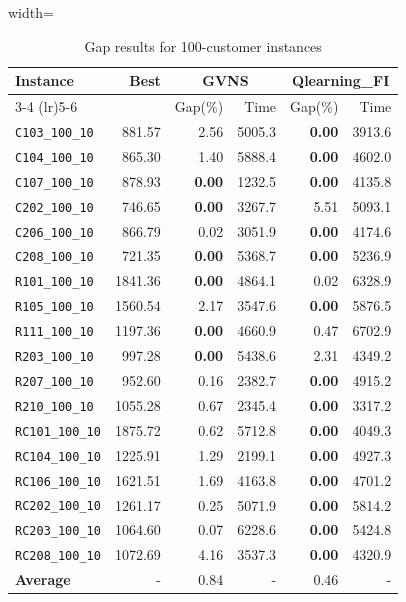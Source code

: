 \begin{table}[ht]
\centering
\small
\setlength{\tabcolsep}{5pt}
\caption{Gap results for 100-customer instances}
\vspace{4mm}
\begin{adjustbox}{width=\textwidth}
\begin{tabular}{l r r r @{\hspace{8pt}} r r @{\hspace{8pt}}}
\toprule
\multirow{2}{*}{Instance} & \multirow{2}{*}{Best} & \multicolumn{2}{c}{GVNS} & \multicolumn{2}{c}{Qlearning\_FI} \\
\cmidrule(lr){3-4} \cmidrule(lr){5-6}
 &  & Gap(\%) & Time & Gap(\%) & Time \\
\midrule
\texttt{C103\_100\_10} & 881.57 & 2.56 & 5005.3 & \textbf{0.00} & 3913.6 \\
\texttt{C104\_100\_10} & 865.30 & 1.40 & 5888.4 & \textbf{0.00} & 4602.0 \\
\texttt{C107\_100\_10} & 878.93 & \textbf{0.00} & 1232.5 & \textbf{0.00} & 4135.8 \\
\texttt{C202\_100\_10} & 746.65 & \textbf{0.00} & 3267.7 & 5.51 & 5093.1 \\
\texttt{C206\_100\_10} & 866.79 & 0.02 & 3051.9 & \textbf{0.00} & 4174.6 \\
\texttt{C208\_100\_10} & 721.35 & \textbf{0.00} & 5368.7 & \textbf{0.00} & 5236.9 \\
\texttt{R101\_100\_10} & 1841.36 & \textbf{0.00} & 4864.1 & 0.02 & 6328.9 \\
\texttt{R105\_100\_10} & 1560.54 & 2.17 & 3547.6 & \textbf{0.00} & 5876.5 \\
\texttt{R111\_100\_10} & 1197.36 & \textbf{0.00} & 4660.9 & 0.47 & 6702.9 \\
\texttt{R203\_100\_10} & 997.28 & \textbf{0.00} & 5438.6 & 2.31 & 4349.2 \\
\texttt{R207\_100\_10} & 952.60 & 0.16 & 2382.7 & \textbf{0.00} & 4915.2 \\
\texttt{R210\_100\_10} & 1055.28 & 0.67 & 2345.4 & \textbf{0.00} & 3317.2 \\
\texttt{RC101\_100\_10} & 1875.72 & 0.62 & 5712.8 & \textbf{0.00} & 4049.3 \\
\texttt{RC104\_100\_10} & 1225.91 & 1.29 & 2199.1 & \textbf{0.00} & 4927.3 \\
\texttt{RC106\_100\_10} & 1621.51 & 1.69 & 4163.8 & \textbf{0.00} & 4701.2 \\
\texttt{RC202\_100\_10} & 1261.17 & 0.25 & 5071.9 & \textbf{0.00} & 5814.2 \\
\texttt{RC203\_100\_10} & 1064.60 & 0.07 & 6228.6 & \textbf{0.00} & 5424.8 \\
\texttt{RC208\_100\_10} & 1072.69 & 4.16 & 3537.3 & \textbf{0.00} & 4320.9 \\
\midrule
\textbf{Average} & - & 0.84 & - & 0.46 & - \\
\bottomrule
\end{tabular}
\end{adjustbox}
\end{table}